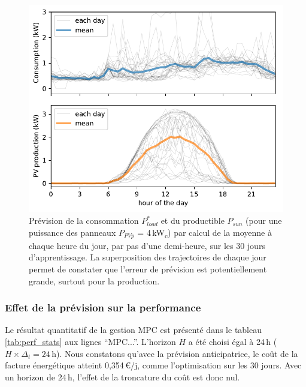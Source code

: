 \documentclass[a4paper,10pt,twocolumn]{article}
\newcommand\sub[1]{\textsubscript{#1}}
\begin{document}
\begin{figure}
        \begin{center}
                \includegraphics[width=1\columnwidth]{figures/daily_traj_M-1-2011-11-28_PV4kWp.pdf}
        \end{center}

        \caption{Prévision de la consommation $P_{load}^*$ et du productible $P_{sun}$
        (pour une puissance des panneaux $P_{PVp}$ = 4\,kW\sub{c})
        par calcul de la moyenne à chaque heure du jour, par pas d'une demi-heure,
        sur les 30 jours d'apprentissage.
        La superposition des trajectoires de chaque jour permet de constater
        que l'erreur de prévision est potentiellement grande, surtout pour la production.
        }
        \label{fig:pred}
\end{figure}

\subsubsection{Effet de la prévision sur la performance}

Le résultat quantitatif de la gestion MPC est présenté dans le tableau \ref{tab:perf_stats}
aux lignes ``MPC...''. L'horizon $H$ a été choisi égal à 24\,h ($H \times \Delta_t = 24$\,h).
Nous constatons qu'avec la prévision anticipatrice, le coût de la facture énergétique
atteint 0,354\,€/j, comme l'optimisation sur les 30 jours.
Avec un horizon de 24\,h, l'effet de la troncature du coût est donc nul.
\end{document}
